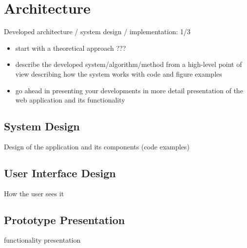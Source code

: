 \chapter{Architecture}
Developed architecture / system design / implementation: 1/3

\begin{itemize}
	\item start with a theoretical approach
	      ???
	\item describe the developed system/algorithm/method from a high-level point of view
	      describing how the system works with code and figure examples
	\item go ahead in presenting your developments in more detail
	      presentation of the web application and its functionality
\end{itemize}



\section{System Design}
Design of the application and its components (code examples)
\section{User Interface Design}
How the user sees it
\section{Prototype Presentation}
functionality presentation